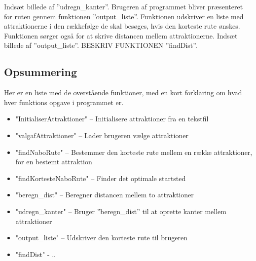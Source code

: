 Indsæt billede af ”udregn\_kanter”.
Brugeren af programmet bliver præsenteret for ruten gennem funktionen ”output\_liste”. Funktionen udskriver en liste med attraktionerne i den rækkefølge de skal besøges, hvis den korteste rute ønskes. Funktionen sørger også for at skrive distancen mellem attraktionerne. 
Indsæt billede af ”output\_liste”.
BESKRIV FUNKTIONEN ”findDist”.

\subsection{Opsummering}
Her er en liste med de overstående funktioner, med en kort forklaring om hvad hver funktions opgave i programmet er.
\begin{itemize}
	\item "InitialiserAttraktioner" – Initialisere attraktioner fra en tekstfil
	\item "valgafAttraktioner" – Lader brugeren vælge attraktioner
	\item "findNaboRute" – Bestemmer den korteste rute mellem en række attraktioner, for en bestemt attraktion
	\item "findKortesteNaboRute" – Finder det optimale startsted
	\item "beregn\_dist" – Beregner distancen mellem to attraktioner
	\item "udregn\_kanter" – Bruger ”beregn\_dist” til at oprette kanter mellem attraktioner
	\item "output\_liste" – Udskriver den korteste rute til brugeren
	\item "findDist" - ..
\end{itemize}


